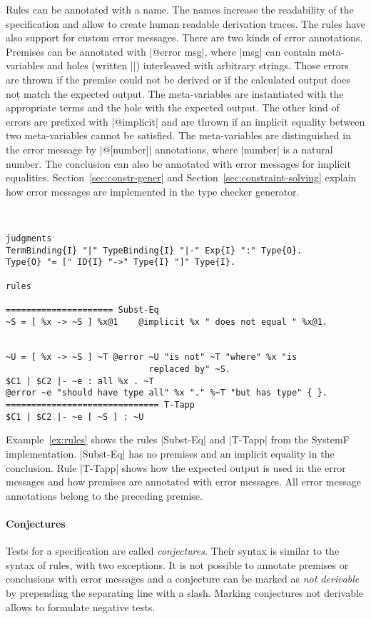 Rules can be annotated with a name. The names increase the readability
of the specification and allow to create human readable derivation
traces. The rules have also support for custom error messages. There
are two kinds of error annotations. Premises can be annotated with
\code|@error msg|, where \code|msg| can contain meta-variables and
holes (written \code|{}|) interleaved with arbitrary strings. Those
errors are thrown if the premise could not be derived or if the
calculated output does not match the expected output. The
meta-variables are instantiated with the appropriate terms and the
hole with the expected output. The other kind of errors are prefixed
with \code|@implicit| and are thrown if an implicit equality between
two meta-variables cannot be satisfied. The meta-variables are
distinguished in the error message by \code|@[number]| annotations,
where \code|number| is a natural number. The conclusion can also be
annotated with error messages for implicit
equalities. Section~\ref{sec:constr-gener} and
Section~\ref{sec:constraint-solving} explain how error messages are
implemented in the type checker generator.

\begin{example}{~}
\begin{lstlisting}[language=sltc]
judgments
TermBinding{I} "|" TypeBinding{I} "|-" Exp{I} ":" Type{O}.
Type{O} "= [" ID{I} "->" Type{I} "]" Type{I}.

rules

===================== Subst-Eq
~S = [ %x -> ~S ] %x@1    @implicit %x " does not equal " %x@1.


~U = [ %x -> ~S ] ~T @error ~U "is not" ~T "where" %x "is
                            replaced by" ~S.
$C1 | $C2 |- ~e : all %x . ~T 
@error ~e "should have type all" %x "." %~T "but has type" { }.
============================== T-Tapp
$C1 | $C2 |- ~e [ ~S ] : ~U
\end{lstlisting}
\label{ex:rules}
\end{example}

Example~\ref{ex:rules} shows the rules \code|Subst-Eq| and
\code|T-Tapp| from the SystemF 
implementation. \code|Subst-Eq| has no premises and an implicit
equality in the conclusion. Rule \code|T-Tapp| shows how the expected
output is used in the error messages and how premises are annotated
with error messages. All error message annotations belong to the
preceding premise.

\paragraph{Conjectures} Tests for a specification are called
\textit{conjectures}. Their syntax is similar to the syntax of rules,
with two exceptions. It is not possible to annotate premises or
conclusions with error messages and a conjecture can be marked as
\textit{not derivable} by prepending the separating line with a
slash. Marking conjectures not derivable allows to formulate negative
tests.

